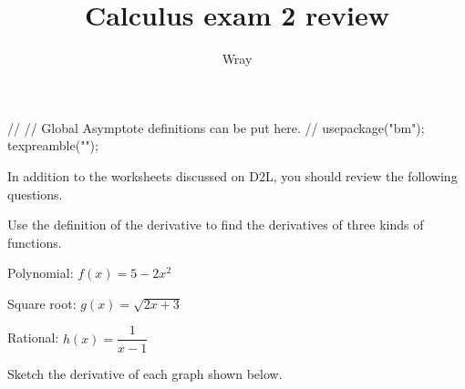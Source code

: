 \documentclass[addpoints, 12pt]{exam}
\title{Calculus exam 2 review}
\author{Wray}
\begin{document}
\begin{asydef}
//
// Global Asymptote definitions can be put here.
//
usepackage("bm");
texpreamble("\def\V#1{\bm{#1}}");
\end{asydef}


\bigskip
\bigskip

\smallskip

In addition to the worksheets discussed on D2L, you should review the following questions.

\bigskip

Use the definition of the derivative to find the derivatives of three kinds of functions.
\begin{questions}
\question
Polynomial: $f(x) = 5 - 2x^2$

\question
Square root: $g(x) = \sqrt{2x + 3}$

\question
Rational: $h(x) = \dfrac{1}{x - 1}$
\end{questions}

\bigskip
Sketch the derivative of each graph shown below.
\end{document}
